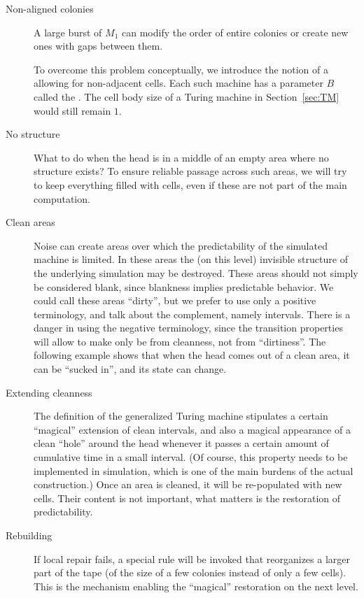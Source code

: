 \documentclass[12pt]{memoir}
\def\B{B}
\begin{document}
\begin{description}

\item[Non-aligned colonies] A large burst of \( M_1 \) can modify the order of
entire colonies or create new ones with gaps between them.

To overcome this problem conceptually, we 
introduce the notion of a 
allowing for non-adjacent cells.
Each such machine has a parameter \( \B \) called the .
The cell body size of a Turing machine in Section~\ref{sec:TM} would still remain
\( 1 \).

    \item[No structure] What to do when the head is in a middle of an empty area
       where no structure exists?
To ensure reliable passage across such areas,
we will try to keep everything filled with cells, even if these are
not part of the main computation.

\item[Clean areas]
    Noise can create areas over
which the predictability of the simulated machine is limited.
In these areas the (on this level) invisible structure
of the underlying simulation may be destroyed.
These areas should not simply be considered blank, since
blankness implies predictable behavior.
We could call these areas ``dirty'', but we prefer to use only a positive terminology,
and talk about the complement, namely  intervals.
There is a danger in using the negative terminology, since the transition properties will allow
to make only be from cleanness, not from ``dirtiness''.
The following example shows that 
when the head comes out of a clean area, it can be
``sucked in'', and its state can change.


\item[Extending cleanness]
 The definition of the generalized
Turing machine stipulates a certain ``magical'' extension of clean intervals,
and also a magical appearance of a clean ``hole'' around the head 
whenever it passes a certain amount of cumulative time in a small interval.
(Of course, this property needs to be implemented in simulation, which is one of the
main burdens of the actual construction.)
Once an area is cleaned, it will be re-populated with new cells.
Their content is not important, what matters is the restoration of predictability.

\item[Rebuilding] If local repair fails, a special rule will be invoked that reorganizes a
larger part of the tape (of the size of a few colonies instead of only a few cells).
This is the mechanism enabling the ``magical'' restoration on the next level.

\end{description}
\end{document}
